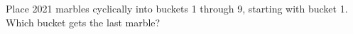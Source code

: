 Place 2021 marbles cyclically into buckets 1 through 9, starting with bucket 1. Which bucket gets the last marble?
